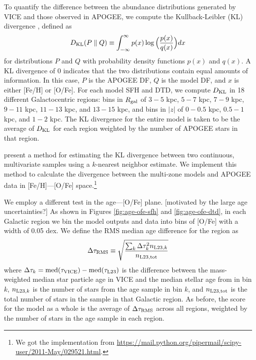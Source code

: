 \documentclass[twocolumn,twocolappendix,linenumbers]{aastex631}
\begin{document}
To quantify the difference between the abundance distributions generated by VICE and those observed in APOGEE, we compute the Kullback-Leibler (KL) divergence \citep{KullbackLeibler1951}, defined as
\begin{equation}
    D_{\rm{KL}}(P \parallel Q) \equiv \int_{-\infty}^{\infty} p(x) \log\Big(\frac{p(x)}{q(x)}\Big) dx
    \label{eq:kl-divergence}
\end{equation}
for distributions $P$ and $Q$ with probability density functions $p(x)$ and $q(x)$. A KL divergence of 0 indicates that the two distributions contain equal amounts of information. In this case, $P$ is the APOGEE DF, $Q$ is the model DF, and $x$ is either [Fe/H] or [O/Fe]. For each model SFH and DTD, we compute $D_{\rm{KL}}$ in 18 different Galactocentric regions: bins in $R_{\rm gal}$ of $3-5$ kpc, $5-7$ kpc, $7-9$ kpc, $9-11$ kpc, $11-13$ kpc, and $13-15$ kpc, and bins in $|z|$ of $0-0.5$ kpc, $0.5-1$ kpc, and $1-2$ kpc. The KL divergence for the entire model is taken to be the average of $D_{\rm{KL}}$ for each region weighted by the number of APOGEE stars in that region.

\citet{PerezCruz2008-KLTest2D} present a method for estimating the KL divergence between two continuous, multivariate samples using a $k$-nearest neighbor estimate. We implement this method to calculate the divergence between the multi-zone models and APOGEE data in [Fe/H]---[O/Fe] space.\footnote{We got the implementation from \url{https://mail.python.org/pipermail/scipy-user/2011-May/029521.html}.}

We employ a different test in the age---[O/Fe] plane. [motivated by the large age uncertainties?] As shown in Figures \ref{fig:age-ofe-sfh} and \ref{fig:age-ofe-dtd}, in each Galactic region we bin the model outputs and data into bins of [O/Fe] with a width of 0.05 dex. We define the RMS median age difference for the region as
\begin{equation}
    \Delta\tau_{\rm RMS} \equiv \sqrt{\frac{\sum_k \Delta\tau_k^2 n_{{\rm L23},k}}{n_{\rm L23,tot}}}
    \label{eq:age-ofe-score}
\end{equation}
where $\Delta\tau_k=\rm{med}(\tau_{\rm VICE})-\rm{med}(\tau_{\rm L23})$ is the difference between the mass-weighted median star particle age in VICE and the median stellar age from \citet{Leung2023-Ages} in bin $k$, $n_{{\rm L23},k}$ is the number of stars from the \citet{Leung2023-Ages} age sample in bin $k$, and $n_{\rm L23,tot}$ is the total number of stars in the sample in that Galactic region. As before, the score for the model as a whole is the average of $\Delta \tau_{\rm RMS}$ across all regions, weighted by the number of stars in the age sample in each region.
\end{document}
